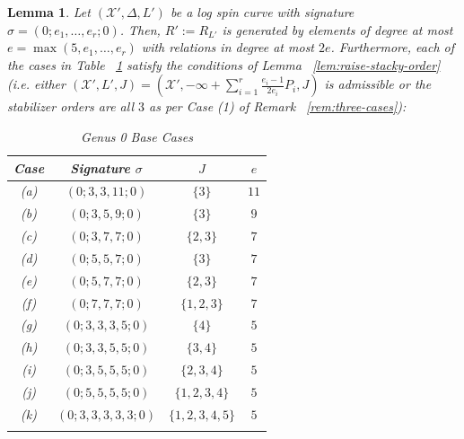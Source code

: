 \documentclass{amsart}
\theoremstyle{plain}
\newtheorem{lem}[thm]{Lemma}
\theoremstyle{definition}
\theoremstyle{remark}
\numberwithin{equation}{section}
\newcommand\sx{\mathscr X}
\newcommand \subhalf[1]{\frac{{#1} - 1}{2{#1}}}
\newcommand{\halfcan}{L}
\DeclareMathOperator{\initial}{in_\prec}
\begin{document}
\begin{lem}
\label{lem:g-0-admissible-cases}
Let $(\sx', \Delta, \halfcan')$ be a log spin curve with signature
$\sigma = (0; e_1, \ldots, e_r; 0)$. Then, $R' := R_{\halfcan'}$ is
generated by elements of degree at most $e = \max(5 , e_1, \ldots,
e_r)$ with relations in degree at most $2e$. Furthermore, each of
the cases in Table ~\ref{table:g-0-base-cases} satisfy the
conditions of Lemma ~\ref{lem:raise-stacky-order} (i.e. either $(\sx',
\halfcan', J) = (\sx', -\infty + \sum_{i = 1}^{r} \subhalf{e_i}
P_i, J)$ is admissible or the stabilizer orders are all $3$ as per
Case (1) of Remark ~\ref{rem:three-cases}):
 
\rm{
\begin{longtable}
	{| c || c | c | c |}
	\hline
	Case & Signature $\sigma$ & $J$ & $e$\\
	\hline
	\hline

	(a) & $(0; 3, 3, 11; 0)$ & $\{3\}$ & $11$ \\	\hline

	(b) & $(0; 3, 5, 9; 0)$ & $\{3\}$	& $9$ \\ \hline

	(c) & $(0; 3, 7, 7; 0)$ & $\{2, 3\}$ & $7$ \\ \hline

	(d) & $(0; 5, 5, 7; 0)$ & $\{3\}$	& $7$ \\ \hline
	
	(e) & $(0; 5, 7, 7; 0)$ & $\{2, 3\}$ & $7$ \\ \hline
	
	(f) & $(0; 7, 7, 7; 0)$ & $\{1, 2, 3\}$	& $7$ \\ \hline

	(g) & $(0; 3, 3, 3, 5; 0)$ & $\{4\}$ & $5$ \\ \hline
	
	(h) & $(0; 3, 3, 5, 5; 0)$ & $\{3, 4\}$ & $5$ \\ \hline
	
	(i) & $(0; 3, 5, 5, 5; 0)$ & $\{2, 3, 4\}$ & $5$ \\ \hline
	
	(j) & $(0; 5, 5, 5, 5; 0)$ & $\{1, 2, 3, 4\}$ & $5$ \\ \hline

	(k) &	$(0; 3, 3, 3, 3, 3; 0)$ & $\{1, 2, 3, 4, 5\}$ & $5$ \\ \hline
	
	\caption{Genus 0 Base Cases}
	\label{table:g-0-base-cases}
\end{longtable}
}

\end{lem}
\end{document}
